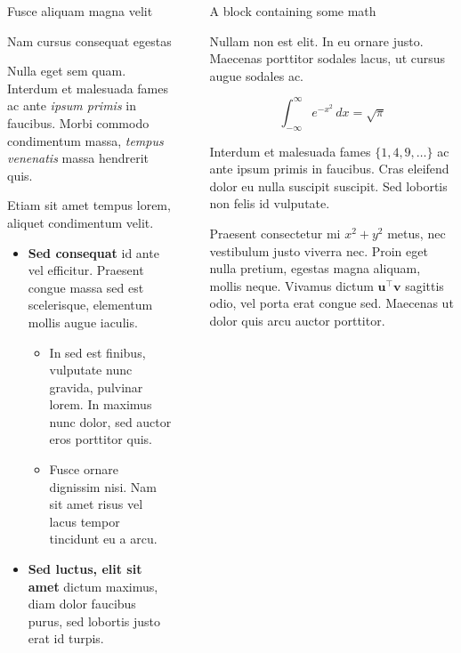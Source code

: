\documentclass[final]{beamer}
\newlength{\sepwidth}
\newlength{\colwidth}
\newcommand{\separatorcolumn}{\begin{column}{\sepwidth}\end{column}}
\begin{document}
\begin{frame}[t]
\begin{columns}[t]
\begin{column}{\colwidth}
\begin{block}{Fusce aliquam magna velit}
  \end{block}

  \begin{block}{Nam cursus consequat egestas}

    Nulla eget sem quam. Interdum et malesuada fames
    ac ante \textit{ipsum primis} in faucibus. Morbi commodo condimentum massa, \textit{tempus venenatis} massa
    hendrerit quis. 

    Etiam sit amet tempus lorem, aliquet condimentum velit. 

    \begin{itemize}
      \item \textbf{Sed consequat} id ante vel efficitur. Praesent congue massa
        sed est scelerisque, elementum mollis augue iaculis.
        \begin{itemize}
          \item In sed est finibus, vulputate
            nunc gravida, pulvinar lorem. In maximus nunc dolor, sed auctor eros
            porttitor quis.
          \item Fusce ornare dignissim nisi. Nam sit amet risus vel lacus
            tempor tincidunt eu a arcu.
        \end{itemize}
      \item \textbf{Sed luctus, elit sit amet} dictum maximus, diam dolor
        faucibus purus, sed lobortis justo erat id turpis.
    \end{itemize}

  \end{block}

\end{column}

\separatorcolumn

\begin{column}{\colwidth}

  \begin{block}{A block containing some math}

    Nullam non est elit. In eu ornare justo. Maecenas porttitor sodales lacus,
    ut cursus augue sodales ac.

    $$
    \int_{-\infty}^{\infty} e^{-x^2}\,dx = \sqrt{\pi}
    $$

    Interdum et malesuada fames $\{1, 4, 9, \ldots\}$ ac ante ipsum primis in
    faucibus. Cras eleifend dolor eu nulla suscipit suscipit. Sed lobortis non
    felis id vulputate.


    Praesent consectetur mi $x^2 + y^2$ metus, nec vestibulum justo viverra
    nec. Proin eget nulla pretium, egestas magna aliquam, mollis neque. Vivamus
    dictum $\mathbf{u}^\intercal\mathbf{v}$ sagittis odio, vel porta erat
    congue sed. Maecenas ut dolor quis arcu auctor porttitor.


\end{block}
\end{column}
\end{columns}
\end{frame}
\end{document}
